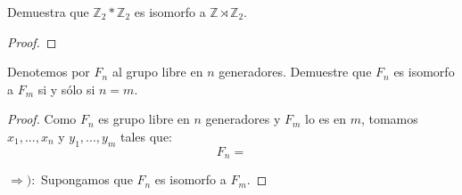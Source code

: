 \documentclass[12pt]{report}
\theoremstyle{largebreak}
\begin{document}
    \begin{excer}
        Demuestra que $\mathbb{Z}_2*\mathbb{Z}_2$ es isomorfo a $\mathbb{Z}\rtimes\mathbb{Z}_2$.
    \end{excer}

    \begin{proof}
        
    \end{proof}

    \begin{excer}
        Denotemos por $F_n$ al grupo libre en $n$ generadores. Demuestre que $F_n$ es isomorfo a $F_m$ si y sólo si $n=m$.
    \end{excer}

    \begin{proof}
        Como $F_n$ es grupo libre en $n$ generadores y $F_m$ lo es en $m$, tomamos $x_1,...,x_n$ y $y_1,...,y_m$ tales que:
        \begin{equation*}
            F_n=
        \end{equation*}

        $\Rightarrow):$ Supongamos que $F_n$ es isomorfo a $F_m$.
    \end{proof}
\end{document}
